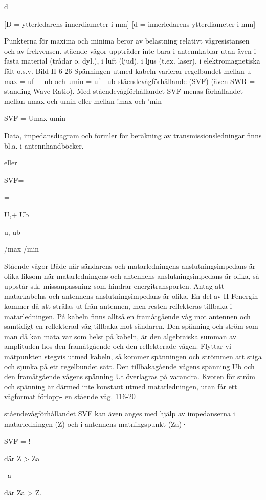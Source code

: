\documentclass[a4paper,twoside,twocolumn,openright]{book}
\begin{document}
{{{{{d

[D = ytterledarens innerdiameter i mm]
[d = innerledarens ytterdiameter i mm]

Punkterna för maxima och minima beror
av belastning relativt vågresistansen och av
frekvensen.
stäende vågor uppträder inte bara i
antennkablar utan även i fasta material (trådar o. dyl.), i luft (ljud), i ljus (t.ex. laser), i
elektromagnetiska fält o.s.v.
Bild II 6-26
Spänningen utmed kabeln varierar regelbundet mellan
u max = uf + ub och umin = uf - ub
ståendevågförhållande (SVF)
(även SWR = standing Wave Ratio).
Med ståendevågförhållandet SVF menas
förhållandet mellan
umax och umin eller mellan !max och 'min

SVF = Umax
umin

Data, impedansdiagram och formler för
beräkning av transmissionsledningar finns
bl.a. i antennhandböcker.

eller

SVF=

=

U,+ Ub

u,-ub

/max
/min

Stående vågor
Både när sändarens och matarledningens
anslutningsimpedans är olika liksom när
matarledningens och antennens anslutningsimpedans är olika, så uppstår s.k. missanpassning som hindrar energitransporten.
Antag att matarkabelns och antennens
anslutningsimpedans är olika. En del av H Fenergin kommer då att strålas ut från antennen, men resten reflekteras tillbaka i matarledningen. På kabeln finns alltså en framåtgående våg mot antennen och samtidigt en
reflekterad våg tillbaka mot sändaren.
Den spänning och ström som man då
kan mäta var som helst på kabeln, är den
algebraiska summan av amplituden hos den
framåtgående och den reflekterade vågen.
Flyttar vi mätpunkten stegvis utmed kabeln, så kommer spänningen och strömmen
att stiga och sjunka på ett regelbundet sätt.
Den tillbakagående vågens spänning Ub
och den framåtgående vågens spänning Ut
överlagras på varandra. Kvoten för ström
och spänning är därmed inte konstant utmed matarledningen, utan får ett vågformat
förlopp- en stående våg.
116-20

ståendevågförhållandet SVF kan även
anges med hjälp av impedanserna i matarledningen (Z) och i antennens matningspunkt (Za)·

SVF = !

där Z > Za

~a

där Za > Z.

}}}}}
\end{document}
